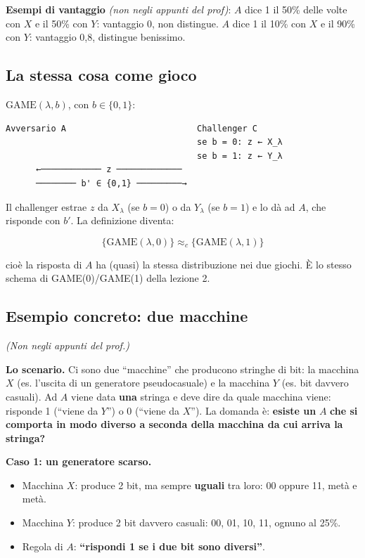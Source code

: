 \begin{esempio}

\textbf{Esempi di vantaggio} \emph{(non negli appunti del prof)}: \(A\) dice 1 il 50\% delle volte con \(X\) e il 50\% con \(Y\): vantaggio 0, non distingue. \(A\) dice 1 il 10\% con \(X\) e il 90\% con \(Y\): vantaggio 0,8, distingue benissimo.

\end{esempio}

\subsection{La stessa cosa come gioco}

\(\text{GAME}(\lambda, b)\), con \(b \in \{0, 1\}\):

\begin{verbatim}
Avversario A                          Challenger C
                                      se b = 0: z ← X_λ
                                      se b = 1: z ← Y_λ
      ←──────────── z ─────────────
      ──────── b' ∈ {0,1} ─────────→
\end{verbatim}

Il challenger estrae \(z\) da \(X_\lambda\) (se \(b = 0\)) o da \(Y_\lambda\) (se \(b = 1\)) e lo dà ad \(A\), che risponde con \(b'\). La definizione diventa:

\[
\{\text{GAME}(\lambda, 0)\} \approx_c \{\text{GAME}(\lambda, 1)\}
\]

cioè la risposta di \(A\) ha (quasi) la stessa distribuzione nei due giochi. È lo stesso schema di GAME(0)/GAME(1) della lezione 2.

\subsection{Esempio concreto: due macchine}

\emph{(Non negli appunti del prof.)}

\textbf{Lo scenario.} Ci sono due ``macchine'' che producono stringhe di bit: la macchina \(X\) (es. l'uscita di un generatore pseudocasuale) e la macchina \(Y\) (es. bit davvero casuali). Ad \(A\) viene data \textbf{una} stringa e deve dire da quale macchina viene: risponde 1 (``viene da \(Y\)'') o 0 (``viene da \(X\)''). La domanda è: \textbf{esiste un} \(A\) \textbf{che si comporta in modo diverso a seconda della macchina da cui arriva la stringa?}

\textbf{Caso 1: un generatore scarso.}

\begin{itemize}
\tightlist
\item
  Macchina \(X\): produce 2 bit, ma sempre \textbf{uguali} tra loro: 00 oppure 11, metà e metà.
\item
  Macchina \(Y\): produce 2 bit davvero casuali: 00, 01, 10, 11, ognuno al 25\%.
\item
  Regola di \(A\): \textbf{``rispondi 1 se i due bit sono diversi''}.
\end{itemize}

